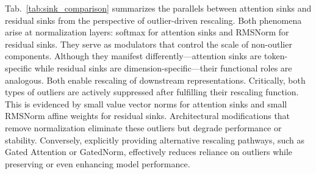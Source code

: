 \documentclass{article} %
\begin{document}
\begin{table}[ht]
\centering
\caption{Comparison of attention sinks and residual sinks under the outlier-driven rescaling perspective.}
\label{tab:sink_comparison}
\end{table}


Tab.~\ref{tab:sink_comparison} summarizes the parallels between attention sinks and residual sinks from the perspective of outlier-driven rescaling.
Both phenomena arise at normalization layers: softmax for attention sinks and RMSNorm for residual sinks. 
They serve as modulators that control the scale of non-outlier components. Although they manifest differently—attention sinks are token-specific while residual sinks are dimension-specific—their functional roles are analogous. 
Both enable rescaling of downstream representations. 
Critically, both types of outliers are actively suppressed after fulfilling their rescaling function. 
This is evidenced by small value vector norms for attention sinks and small RMSNorm affine weights for residual sinks. 
Architectural modifications that remove normalization eliminate these outliers but degrade performance or stability. 
Conversely, explicitly providing alternative rescaling pathways, such as Gated Attention or GatedNorm, effectively reduces reliance on outliers while preserving or even enhancing model performance.
\end{document}
